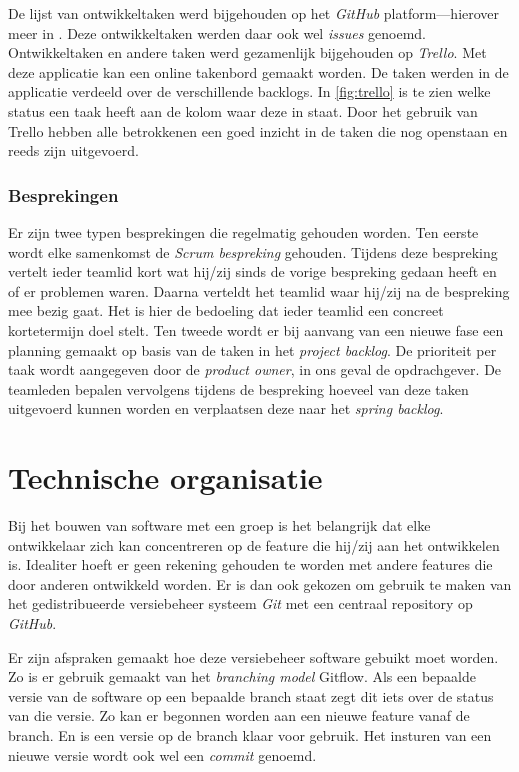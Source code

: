 De lijst van ontwikkeltaken werd bijgehouden op het \emph{GitHub} platform—hierover meer in . Deze ontwikkeltaken werden daar ook wel \emph{issues} genoemd. Ontwikkeltaken en andere taken werd gezamenlijk bijgehouden op \emph{Trello}. Met deze applicatie kan een online takenbord gemaakt worden. De taken werden in de applicatie verdeeld over de verschillende backlogs. In \autoref{fig:trello} is te zien welke status een taak heeft aan de kolom waar deze in staat. Door het gebruik van Trello hebben alle betrokkenen een goed inzicht in de taken die nog openstaan en reeds zijn uitgevoerd.

\subsubsection{Besprekingen}
Er zijn twee typen besprekingen die regelmatig gehouden worden. Ten eerste wordt elke samenkomst de \emph{Scrum bespreking} gehouden. Tijdens deze bespreking vertelt ieder teamlid kort wat hij/zij sinds de vorige bespreking gedaan heeft en of er problemen waren. Daarna verteldt het teamlid waar hij/zij na de bespreking mee bezig gaat. Het is hier de bedoeling dat ieder teamlid een concreet kortetermijn doel stelt.
Ten tweede wordt er bij aanvang van een nieuwe fase een planning gemaakt op basis van de taken in het \emph{project backlog}. De prioriteit per taak wordt aangegeven door de \emph{product owner}, in ons geval de opdrachgever. De teamleden bepalen vervolgens tijdens de bespreking hoeveel van deze taken uitgevoerd kunnen worden en verplaatsen deze naar het \emph{spring backlog}. 

\section{Technische organisatie} \label{sec:technische_organisatie}
Bij het bouwen van software met een groep is het belangrijk dat elke ontwikkelaar zich kan concentreren op de feature die hij/zij aan het ontwikkelen is. Idealiter hoeft er geen rekening gehouden te worden met andere features die door anderen ontwikkeld worden. Er is dan ook gekozen om gebruik te maken van het gedistribueerde versiebeheer systeem \emph{Git} met een centraal repository op \emph{GitHub}.

Er zijn afspraken gemaakt hoe deze versiebeheer software gebuikt moet worden. Zo is er gebruik gemaakt van het \emph{branching model} Gitflow\cite{Gitflow2010}. Als een bepaalde versie van de software op een bepaalde branch staat zegt dit iets over de status van die versie. Zo kan er begonnen worden aan een nieuwe feature vanaf de  branch. En is een versie op de  branch klaar voor gebruik. Het insturen van een nieuwe versie wordt ook wel een \emph{commit} genoemd.

